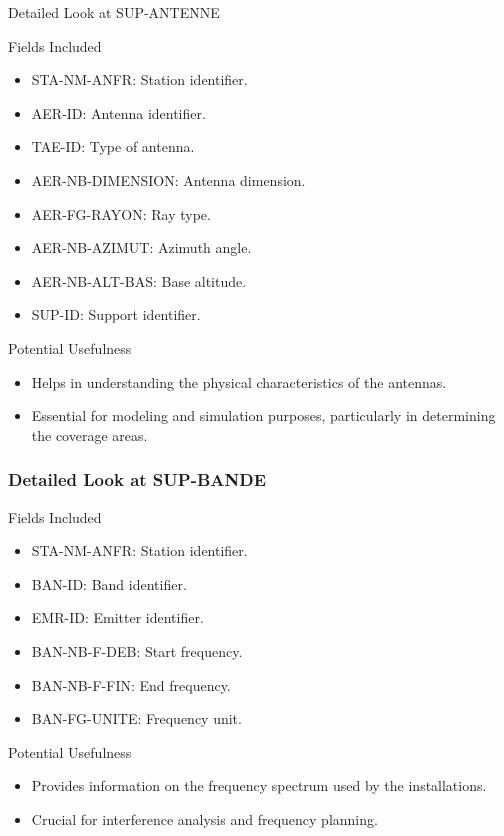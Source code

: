 \begin{frame}{Detailed Look at SUP-ANTENNE}
    \begin{block}{Fields Included}
        \begin{itemize}
            \item STA-NM-ANFR: Station identifier.
            \item AER-ID: Antenna identifier.
            \item TAE-ID: Type of antenna.
            \item AER-NB-DIMENSION: Antenna dimension.
            \item AER-FG-RAYON: Ray type.
            \item AER-NB-AZIMUT: Azimuth angle.
            \item AER-NB-ALT-BAS: Base altitude.
            \item SUP-ID: Support identifier.
        \end{itemize}
    \end{block}    

    \begin{block}{Potential Usefulness}
        \begin{itemize}
            \item Helps in understanding the physical characteristics of the antennas.
            \item Essential for modeling and simulation purposes, particularly in determining the coverage areas.
        \end{itemize}
    \end{block}
\end{frame}
    
\begin{frame}
\frametitle{Detailed Look at SUP-BANDE}
    \begin{block}{Fields Included}
        \begin{itemize}
            \item STA-NM-ANFR: Station identifier.
            \item BAN-ID: Band identifier.
            \item EMR-ID: Emitter identifier.
            \item BAN-NB-F-DEB: Start frequency.
            \item BAN-NB-F-FIN: End frequency.
            \item BAN-FG-UNITE: Frequency unit.
        \end{itemize}    
    \end{block}
    \begin{block}{Potential Usefulness}    
        \begin{itemize}
            \item Provides information on the frequency spectrum used by the installations.
            \item Crucial for interference analysis and frequency planning.
        \end{itemize}
    \end{block}    
\end{frame}
    
